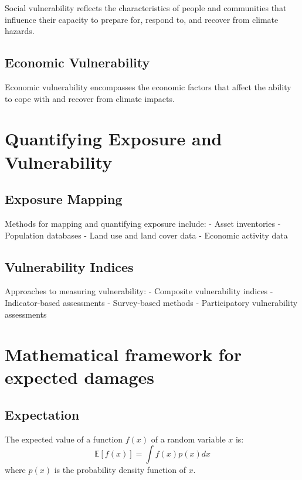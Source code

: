 \documentclass[
  letterpaper,
  DIV=11,
  numbers=noendperiod]{scrreprt}
\begin{document}
Social vulnerability reflects the characteristics of people and
communities that influence their capacity to prepare for, respond to,
and recover from climate hazards.

\subsection{Economic Vulnerability}\label{economic-vulnerability}

Economic vulnerability encompasses the economic factors that affect the
ability to cope with and recover from climate impacts.

\section{Quantifying Exposure and
Vulnerability}\label{quantifying-exposure-and-vulnerability}

\subsection{Exposure Mapping}\label{exposure-mapping}

Methods for mapping and quantifying exposure include: - Asset
inventories - Population databases - Land use and land cover data -
Economic activity data

\subsection{Vulnerability Indices}\label{vulnerability-indices}

Approaches to measuring vulnerability: - Composite vulnerability indices
- Indicator-based assessments - Survey-based methods - Participatory
vulnerability assessments

\section{Mathematical framework for expected
damages}\label{mathematical-framework-for-expected-damages}

\subsection{Expectation}\label{expectation}

The expected value of a function \(f(x)\) of a random variable \(x\) is:
\[
\mathbb{E}[f(x)] = \int f(x) p(x) dx
\] where \(p(x)\) is the probability density function of \(x\).
\end{document}
